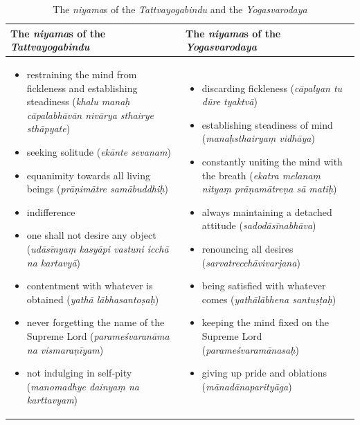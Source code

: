 \begin{table}[!htb]
  \footnotesize
\centering
\begin{tabular}{|m{5cm}|m{5cm}|}
\hline
\textbf{The \textit{niyama}s of the \textit{Tattvayogabindu}} & \textbf{The \textit{niyama}s of the \textit{Yogasvarodaya}} \\
\hline
\begin{itemize}
\item restraining the mind from fickleness and establishing steadiness (\textit{khalu manaḥ cāpalabhāvān nivārya sthairye sthāpyate})
\item seeking solitude (\textit{ekānte sevanam})
\item equanimity towards all living beings (\textit{prāṇimātre samābuddhiḥ})
\item indifference
\item one shall not desire any object (\textit{udāsīnyaṃ kasyāpi vastuni icchā na kartavyā})
\item contentment with whatever is obtained (\textit{yathā lābhasantoṣaḥ})
\item never forgetting the name of the Supreme Lord (\textit{parameśvaranāma na vismaraṇīyam})
\item not indulging in self-pity (\textit{manomadhye dainyaṃ na karttavyam})
\end{itemize}
&
\begin{itemize}
\item discarding fickleness (\textit{cāpalyan tu dūre tyaktvā})
\item establishing steadiness of mind (\textit{manaḥsthairyaṃ vidhāya})
\item constantly uniting the mind with the breath (\textit{ekatra melanaṃ nityaṃ prāṇamātreṇa sā matiḥ})
\item always maintaining a detached attitude (\textit{sadodāsīnabhāva})
\item renouncing all desires (\textit{sarvatrecchāvivarjana})
\item being satisfied with whatever comes (\textit{yathālābhena santuṣṭaḥ})
\item keeping the mind fixed on the Supreme Lord (\textit{parameśvaramānasaḥ})
\item giving up pride and oblations (\textit{mānadānaparityāga})
\end{itemize}
\\
\hline
\end{tabular}
\caption{The \textit{niyama}s of the \emph{Tattvayogabindu} and the \emph{Yogasvarodaya}}
\label{tab-niyama}
\end{table}
\normalsize

